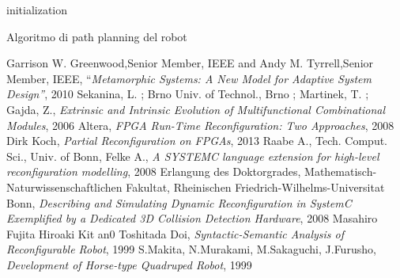 \documentclass[a4paper,titlepage]{book}
\begin{document}
\begin{algorithm}[H]
 initialization\;
\caption{Algoritmo di path planning del robot}
\end{algorithm}


\begin{thebibliography}{1}
 Garrison W. Greenwood,Senior Member, IEEE and Andy M. Tyrrell,Senior Member, IEEE, ``\textit{Metamorphic Systems: A New Model for Adaptive System Design''}, 2010
 Sekanina, L. ; Brno Univ. of Technol., Brno ; Martinek, T. ; Gajda, Z., \textit{Extrinsic and Intrinsic Evolution of Multifunctional Combinational Modules}, 2006
 Altera, \textit{FPGA Run-Time Reconfiguration: Two Approaches}, 2008
 Dirk Koch, \textit{Partial Reconfiguration on FPGAs}, 2013
 Raabe A., Tech. Comput. Sci., Univ. of Bonn, Felke A., \textit{A SYSTEMC language extension for high-level reconfiguration modelling}, 2008
 Erlangung des Doktorgrades, Mathematisch-Naturwissenschaftlichen Fakultat, Rheinischen Friedrich-Wilhelms-Universitat Bonn, \textit{Describing and Simulating Dynamic Reconfiguration in SystemC Exemplified by a Dedicated 3D Collision Detection Hardware}, 2008
 Masahiro Fujita Hiroaki Kit an0 Toshitada Doi, \textit{Syntactic-Semantic Analysis of Reconfigurable Robot}, 1999
 S.Makita, N.Murakami, M.Sakaguchi, J.Furusho, \textit{Development of Horse-type Quadruped Robot}, 1999
\end{thebibliography}
\end{document}
